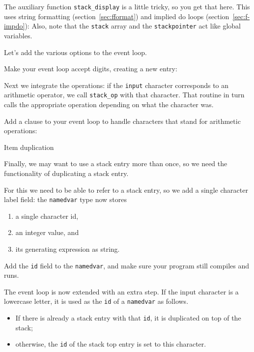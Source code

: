 The auxiliary function \lstinline{stack_display} is a little tricky,
so you get that here.
This uses string formatting (section~\ref{sec:fformat})
and implied do loops (section~\ref{sec:f-impdo}):
Also, note that the \lstinline{stack} array and the \lstinline{stackpointer}
act like global variables.
%

Let's add the various options to the event loop.

\begin{exercise}
  \label{ex:f-var-loop-dig-name}
  Make your event loop accept digits, creating a new entry:
  \def\snippetcodefraction{.7}
  \def\snippetanswfraction{.9}
\end{exercise}

Next we integrate the operations:
if the \lstinline{input} character corresponds
to an arithmetic operator,
we call \lstinline{stack_op} with that character.
That routine in turn calls the appropriate operation
depending on what the character was.

\begin{exercise}
  \label{ex:f-var-loop-op}
  Add a clause to your event loop
  to handle characters that stand for arithmetic operations:
  \def\snippetcodefraction{.7}
  \def\snippetanswfraction{.9}
\end{exercise}

 {Item duplication}

Finally, we may want to use a stack entry more than once,
so we need the functionality of
duplicating a stack entry.

For this we need to be able to refer to a stack entry,
so we add a single character label field:
the \lstinline{namedvar} type now stores
\begin{enumerate}
\item a single character id,
\item an integer value, and
\item its generating expression as string.
\end{enumerate}
%

\begin{exercise}
  \label{ex:f-stack-extend-id}
  Add the \lstinline{id} field to the \lstinline{namedvar},
  and make sure your program still compiles and runs.
\end{exercise}

The event loop is now extended with an extra step.
If the input character is a lowercase letter,
it is used as the \lstinline{id} of a \lstinline{namedvar}
as follows.
\begin{itemize}
\item If there is already a stack entry with that \lstinline{id},
  it is duplicated on top of the stack;
\item otherwise, the \lstinline{id} of the stack top entry
  is set to this character.
\end{itemize}

